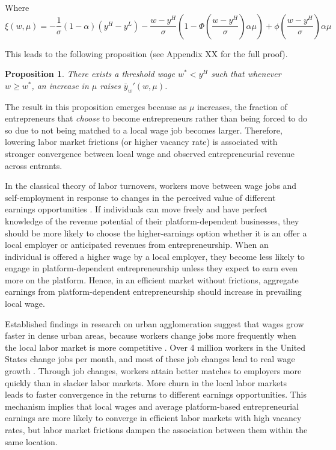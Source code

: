 \documentclass[letterpaper,12pt]{article}
\newtheorem{proposition}{Proposition}
\begin{document}
Where
$$\xi(w,\mu) = -\frac{1}{\sigma}(1-\alpha)(y^{H}-y^{L})-\frac{w-y^{H}}{\sigma}\left(1-\Phi\left(\frac{w-y^{H}}{\sigma}\right)\alpha\mu\right)+\phi\left(\frac{w-y^{H}}{\sigma}\right)\alpha\mu$$

This leads to the following proposition (see Appendix XX for the full proof).
\begin{proposition} \label{prop:h2}
    There exists a threshold wage $w^{*}<y^{H}$ such that whenever $w\geq w^{*}$, an increase in $\mu$ raises $\bar{y}_{w}'(w,\mu)$.
\end{proposition}

The result in this proposition emerges because as $\mu$ increases, the fraction of entrepreneurs that \textit{choose} to become entrepreneurs rather than being forced to do so due to not being matched to a local wage job becomes larger. Therefore, lowering labor market frictions (or higher vacancy rate) is associated with stronger convergence between local wage and observed entrepreneurial revenue across entrants.

In the classical theory of labor turnovers, workers move between wage jobs and self-employment in response to changes in the perceived value of different earnings opportunities \citep{jovanovic_job_1979,jovanovic_matching_1984}. If individuals can move freely and have perfect knowledge of the revenue potential of their platform-dependent businesses, they should be more likely to choose the higher-earnings option whether it is an offer a local employer or anticipated revenues from entrepreneurship. When an individual is offered a higher wage by a local employer, they become less likely to engage in platform-dependent entrepreneurship unless they expect to earn even more on the platform. Hence, in an efficient market without frictions, aggregate earnings from platform-dependent entrepreneurship should increase in prevailing local wage.


Established findings in research on urban agglomeration suggest that wages grow faster in dense urban areas, because workers change jobs more frequently when the local labor market is more competitive \citep{wheeler_cities_2006,finney_effect_2008,cullen_outsourcing_2021}. Over 4 million workers in the United States change jobs per month, and most of these job changes lead to real wage growth \citep{kochhar_majority_2022}. Through job changes, workers attain better matches to employers more quickly than in slacker labor markets. More churn in the local labor markets leads to faster convergence in the returns to different earnings opportunities. This mechanism implies that local wages and average platform-based entrepreneurial earnings are more likely to converge in efficient labor markets with high vacancy rates, but labor market frictions dampen the association between them within the same location. 
\end{document}
